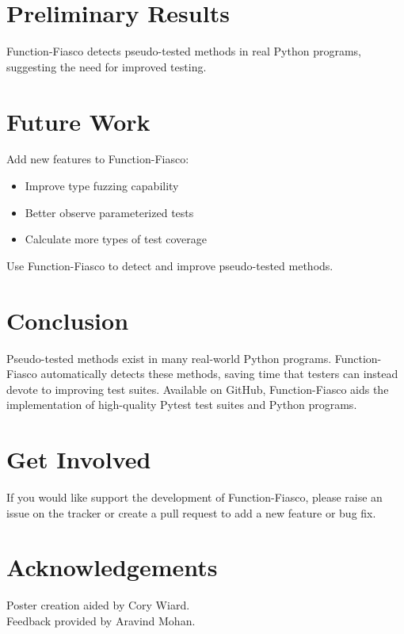 \documentclass[a0paper,fleqn]{betterposter}
\begin{document}
{  }{


  \section{Preliminary Results}

  \vspace*{-1in}

  

  \vspace*{-.5in}

  Function-Fiasco detects pseudo-tested methods in real Python programs,
  suggesting the need for improved testing.

  \section{Future Work}
  Add new features to Function-Fiasco: \\
  \vspace*{-.5in}

  \begin{itemize}[leftmargin=*]

    \item{Improve type fuzzing capability}
    \item{Better observe parameterized tests}
    \item{Calculate more types of test coverage}

  \end{itemize}

  \vspace{.5em}
  Use Function-Fiasco to detect and improve pseudo-tested methods.

  \section{Conclusion}
  Pseudo-tested methods exist in many real-world Python programs.
  Function-Fiasco automatically detects these methods, saving time that testers
  can instead devote to improving test suites.
  Available on GitHub, Function-Fiasco aids the implementation of high-quality
  Pytest test suites and Python programs.

  \section{Get Involved}
  If you would like support the development of Function-Fiasco, please raise an
  issue on the tracker or create a pull request to add a new feature or bug
  fix.
  \vfill

  \section{Acknowledgements}
  Poster creation aided by Cory Wiard.\\
  Feedback provided by Aravind Mohan.\\


}
\end{document}
